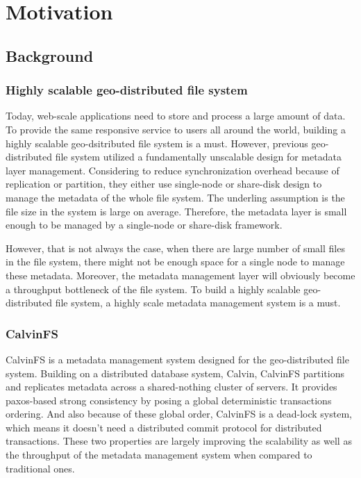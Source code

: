 \section{Motivation}

\subsection{Background}
\subsubsection{Highly scalable geo-distributed file system}
Today, web-scale applications need to store and process a large amount of data. To provide the same responsive service to users all around the world, building a highly scalable geo-dsitributed file system is a must. However, previous geo-distributed file system utilized a fundamentally unscalable design for metadata layer management. Considering to reduce synchronization overhead because of replication or partition, they either use single-node or share-disk design to manage the metadata of the whole file system. The underling assumption is the file size in the system is large on average. Therefore, the metadata layer is small enough to be managed by a single-node or share-disk framework. 

However, that is not always the case, when there are large number of small files in the file system, there might not be enough space for a single node to manage these metadata. Moreover, the metadata management layer will obviously become a throughput bottleneck of the file system. To build a highly scalable geo-distributed file system, a highly scale metadata management system is a must.

\subsubsection{CalvinFS}
CalvinFS \cite{thomson2015calvinfs} is a metadata management system designed for the geo-distributed file system. Building on a distributed database system, Calvin, CalvinFS partitions and replicates metadata across a shared-nothing cluster of servers. It provides paxos-based strong consistency by posing a global deterministic transactions ordering. And also because of these global order, CalvinFS is a dead-lock system, which means it doesn't need a distributed commit protocol for distributed transactions. These two properties are largely improving the scalability as well as the throughput of the metadata management system when compared to traditional ones.

